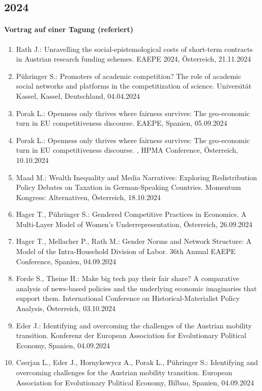 \subsection*{2024}
\paragraph{Vortrag auf einer Tagung (referiert)}
\begin{enumerate}
	\item Rath J.: Unravelling the social-epistemological costs of short-term contracts in Austrian research funding schemes. EAEPE 2024, Österreich, 21.11.2024
	\item Pühringer S.: Promoters of academic competition? The role of academic social networks and platforms in the competitization of science. Universität Kassel, Kassel, Deutschland, 04.04.2024
	\item Porak L.: Openness only thrives where fairness survives: The geo-economic turn in EU competitiveness discourse. EAEPE, Spanien, 05.09.2024
	\item Porak L.: Openness only thrives where fairness survives: The geo-economic turn in EU competitiveness discourse. , HPMA Conference, Österreich, 10.10.2024
	\item Maad M.: Wealth Inequality and Media Narratives: Exploring Redistribution Policy Debates on Taxation in German-Speaking Countries. Momentum Kongress: Alternativen, Österreich, 18.10.2024
	\item Hager T., Pühringer S.: Gendered Competitive Practices in Economics. A Multi-Layer Model of Women’s Underrepresentation, Österreich, 26.09.2024
	\item Hager T., Mellacher P., Rath M.: Gender Norms and Network Structure: A Model of the Intra-Household Division of Labor. 36th Annual EAEPE Conference, Spanien, 04.09.2024
	\item Forde S., Theine H.: Make big tech pay their fair share? A comparative analysis of news-based policies and the underlying economic imaginaries that support them. International Conference on Historical-Materialist Policy Analysis, Österreich, 03.10.2024
	\item Eder J.: Identifying and overcoming the challenges of the Austrian mobility transition. Konferenz der European Association for Evolutionary Political Economy, Spanien, 04.09.2024
	\item Cserjan L., Eder J., Hornykewycz A., Porak L., Pühringer S.: Identifying and overcoming challenges for the Austrian mobility transition. European Association for Evolutionary Political Economy, Bilbao, Spanien, 04.09.2024

\end{enumerate}
